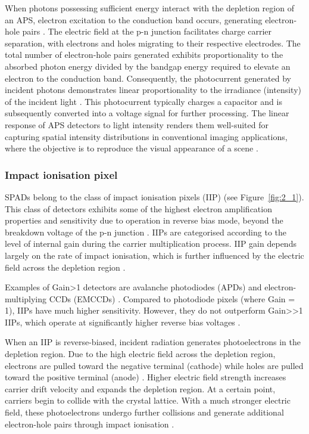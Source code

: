 \documentclass[12pt,a4paper,oneside]{report}
\begin{document}
When photons possessing sufficient energy interact with the depletion region of an APS, electron excitation to the conduction band occurs, generating electron-hole pairs \cite{bass2010}. The electric field at the p-n junction facilitates charge carrier separation, with electrons and holes migrating to their respective electrodes. The total number of electron-hole pairs generated exhibits proportionality to the absorbed photon energy divided by the bandgap energy required to elevate an electron to the conduction band. Consequently, the photocurrent generated by incident photons demonstrates linear proportionality to the irradiance (intensity) of the incident light \cite{bass2010}. This photocurrent typically charges a capacitor and is subsequently converted into a voltage signal for further processing. The linear response of APS detectors to light intensity renders them well-suited for capturing spatial intensity distributions in conventional imaging applications, where the objective is to reproduce the visual appearance of a scene \cite{bass2010}.



\subsubsection{Impact ionisation pixel}
\label{subsubsec:impact_ionisation_pixel}

SPADs belong to the class of impact ionisation pixels (IIP) (see Figure~\ref{fig:2_1}). This class of detectors exhibits some of the highest electron amplification properties and sensitivity due to operation in reverse bias mode, beyond the breakdown voltage of the p-n junction \cite{bass2010}. IIPs are categorised according to the level of internal gain during the carrier multiplication process. IIP gain depends largely on the rate of impact ionisation, which is further influenced by the electric field across the depletion region \cite{bass2010}.

Examples of Gain>1 detectors are avalanche photodiodes (APDs) and electron-multiplying CCDs (EMCCDs) \cite{bass2010}. Compared to photodiode pixels (where Gain = 1), IIPs have much higher sensitivity. However, they do not outperform Gain>>1 IIPs, which operate at significantly higher reverse bias voltages \cite{bass2010}.

When an IIP is reverse-biased, incident radiation generates photoelectrons in the depletion region. Due to the high electric field across the depletion region, electrons are pulled toward the negative terminal (cathode) while holes are pulled toward the positive terminal (anode) \cite{bass2010}. Higher electric field strength increases carrier drift velocity and expands the depletion region. At a certain point, carriers begin to collide with the crystal lattice. With a much stronger electric field, these photoelectrons undergo further collisions and generate additional electron-hole pairs through impact ionisation \cite{bass2010}.
\end{document}
